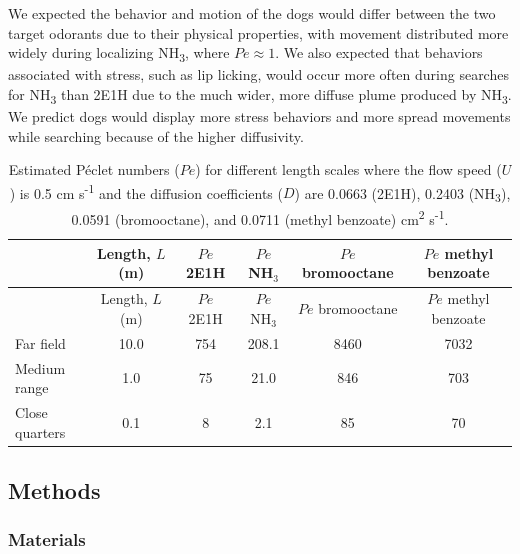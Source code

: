 \documentclass[
]{article}
\begin{document}
We expected the behavior and motion of the dogs would differ between the two target odorants due to their physical properties, with movement distributed more widely during localizing NH\textsubscript{3}, where \(Pe \approx 1\). We also expected that behaviors associated with stress, such as lip licking, would occur more often during searches for NH\textsubscript{3} than 2E1H due to the much wider, more diffuse plume produced by NH\textsubscript{3}. We predict dogs would display more stress behaviors and more spread movements while searching because of the higher diffusivity.

\begin{longtable}[]{@{}lccccc@{}}
\caption{\label{tab:pe-table}Estimated Péclet numbers (\(Pe\)) for different length scales where the flow speed (\(U\)) is 0.5 cm s\textsuperscript{-1} and the diffusion coefficients (\(D\)) are 0.0663 (2E1H), 0.2403 (NH\textsubscript{3}), 0.0591 (bromooctane), and 0.0711 (methyl benzoate) cm\textsuperscript{2} s\textsuperscript{-1}.}\tabularnewline
\toprule\noalign{}
& Length, \(L\) (m) & \(Pe\) 2E1H & \(Pe\) NH\(_3\) & \(Pe\) bromooctane & \(Pe\) methyl benzoate \\
\midrule\noalign{}
\endfirsthead
\toprule\noalign{}
& Length, \(L\) (m) & \(Pe\) 2E1H & \(Pe\) NH\(_3\) & \(Pe\) bromooctane & \(Pe\) methyl benzoate \\
\midrule\noalign{}
\endhead
\bottomrule\noalign{}
\endlastfoot
Far field & 10.0 & 754 & 208.1 & 8460 & 7032 \\
Medium range & 1.0 & 75 & 21.0 & 846 & 703 \\
Close quarters & 0.1 & 8 & 2.1 & 85 & 70 \\
\end{longtable}

\hypertarget{methods}{%
\subsection{Methods}\label{methods}}

\hypertarget{materials}{%
\subsubsection{Materials}\label{materials}}
\end{document}
